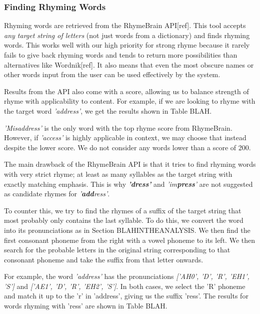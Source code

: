 \subsubsection{Finding Rhyming Words}
\label{sec:rhymebrain}
Rhyming words are retrieved from the RhymeBrain API[ref]. This tool accepts \textit{any target string of letters} (not just words from a dictionary) and finds rhyming words. This works well with our high priority for strong rhyme because it rarely fails to give back rhyming words and tends to return more possibilities than alternatives like Wordnik[ref]. It also means that even the most obscure names or other words input from the user can be used effectively by the system.

Results from the API also come with a score, allowing us to balance strength of rhyme with applicability to content. For example, if we are looking to rhyme with the target word \textit{'address'}, we get the results shown in Table BLAH.


\textit{'Misaddress'} is the only word with the top rhyme score from RhymeBrain. However, if \textit{'access'} is highly applicable in context, we may choose that instead despite the lower score. We do not consider any words lower than a score of 200.

The main drawback of the RhymeBrain API is that it tries to find rhyming words with very strict rhyme; at least as many syllables as the target string with exactly matching emphasis. This is why \textbf{\textit{'dress'}} and \textit{'im\textbf{press}'} are not suggested as candidate rhymes for \textit{'\textbf{add}ress'}.

To counter this, we try to find the rhymes of a suffix of the target string that most probably only contains the last syllable. To do this, we convert the word into its pronunciations as in Section BLAHINTHEANALYSIS. We then find the first consonant phoneme from the right with a vowel phoneme to its left. We then search for the probable letters in the original string corresponding to that consonant phoneme and take the suffix from that letter onwards.

For example, the word \textit{'address'} has the pronunciations \textit{['AH0', 'D', 'R', 'EH1', 'S']} and \textit{['AE1', 'D', 'R', 'EH2', 'S']}. In both cases, we select the 'R' phoneme and match it up to the 'r' in 'address', giving us the suffix 'ress'. The results for words rhyming with 'ress' are shown in Table BLAH.

